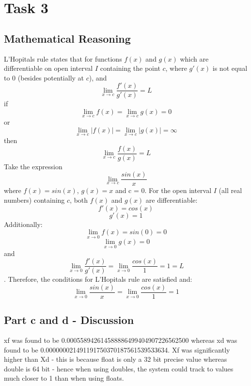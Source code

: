 \documentclass[11pt, oneside]{article}   	%
\begin{document}
\section*{Task 3}
\subsection*{Mathematical Reasoning}
L'Hopitals rule states that for functions \(f(x)\) and \(g(x)\) which are differentiable on open interval \(I\) containing the point \(c\), where \(g'(x)\) is not equal to 0 (besides potentially at \(c\)), and \[\lim_{x \to c} \frac{f'(x)}{g'(x)} = L\] if 
\[ \lim_{x \to c} f(x) = \lim_{x \to c} g(x) = 0 \] or \[ \lim_{x\to c} |f(x)| = \lim_{x\to c} |g(x)| = \infty\]
 then \[\lim_{x \to c} \frac{f(x)}{g(x)} = L\]
\newline
\newline
Take the expression \[\lim_{x \to c} \frac{sin(x)}{x}\] where \(f(x) = sin(x)\), \(g(x) = x\) and c = 0. For the open interval \(I\) (all real numbers) containing \(c\), both \(f(x)\) and \(g(x)\) are differentiable: \[f'(x) = cos(x)\] \[g'(x) = 1\]  Additionally: \[\lim_{x\to 0} f(x) = sin(0) = 0\] \[\lim_{x\to 0} g(x) = 0\]  and \[\lim_{x\to 0} \frac{f'(x)}{g'(x)} = \lim_{x\to 0} \frac{cos(x)}{1} = 1 = L\].  Therefore, the conditions for L'Hopitals rule are satisfied and: \[\lim_{x\to 0} \frac{sin(x)}{x} = \lim_{x\to 0} \frac{cos(x)}{1} = 1\]
\subsection*{Part c and d - Discussion}
xf was found to be 0.000558942614588886499404907226562500 whereas xd was found to be 0.000000021491191750370187561539533634.  Xf was significantly higher than Xd - this is because float is only a 32 bit precise value whereas double is 64 bit - hence when using doubles, the system could track to values much closer to 1 than when using floats.
\end{document}
